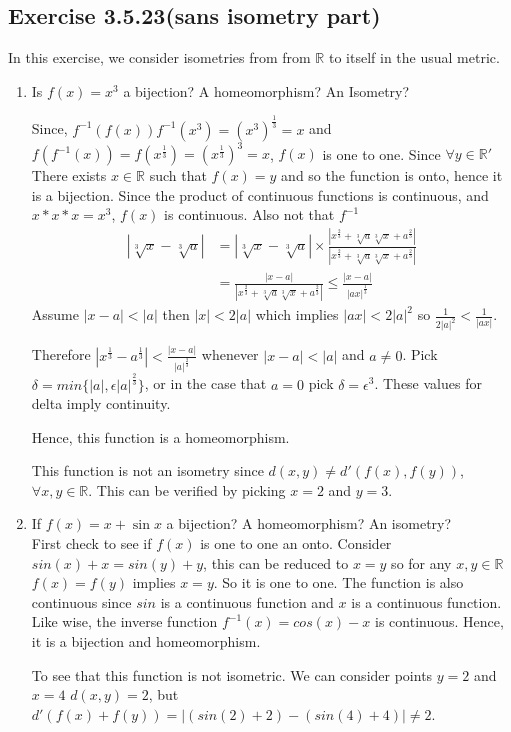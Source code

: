 \documentclass{tufte-book}
\theoremstyle{mytheoremstyle}
\theoremstyle{mylemstyle}
\theoremstyle{mydefstyle}
\begin{document}
\subsection{Exercise 3.5.23(sans isometry part)}
In  this exercise, we consider isometries from from $\mathbb{R}$ to itself in the usual metric.
\begin{enumerate}
\item Is $f(x) = x^3$ a bijection? A homeomorphism? An Isometry?

Since, $f^{-1}(f(x)) f^{-1}(x^3) = (x^3)^\frac{1}{3} = x$ and $f(f^{-1}(x))  = f(x^\frac{1}{3}) =(x^\frac{1}{3})^3 = x$, $f(x)$ is one to one.  Since $\forall y \in \mathbb{R}'$ There exists $x \in \mathbb{R}$ such that $f(x) = y$ and  so the function is onto, hence it is a bijection.   Since the product of continuous functions is continuous, and $x * x* x= x^3$, $f(x)$ is continuous.  Also not that $f^{-1}$
\begin{align*}
|\sqrt[3]{x}-\sqrt[3]{a}| &= |\sqrt[3]{x}-\sqrt[3]{a}| \times \frac {| x^{\frac 2 3} + \sqrt[3]{a}\sqrt[3]{x} + a^{\frac 2 3} |}{|x^{\frac 2 3} + \sqrt[3]{a}\sqrt[3]{x} + a^{\frac 2 3} |}\\
&= \frac {|x - a|}{|x^{\frac 2 3} + \sqrt[3]{a}\sqrt[3]{x} + a^{\frac 2 3} |} \le \frac {| x - a |}{| {ax} |^{\frac 1 3}}
\end{align*}
Assume $|x-a| < |a|$ then $|x| < 2|a|$ which implies $|ax| < 2|a|^2$ so  $\frac {1}{2|a|^2} < \frac {1} {|ax|}$.

Therefore $|x^{\frac{1}{3}} - a^{\frac{1}{3}}| < \frac{|x-a|}{|{a}|^{\frac{2}{3}}}$ whenever $|x - a| < |a|$ and $a \neq 0$.  Pick $\delta = min\{|a|, \epsilon|a|^\frac{2}{3}\}$, or in the case that $a = 0$ pick $\delta = \epsilon^3$.  These values for delta imply continuity.

Hence, this function is a homeomorphism. 

This function is not an isometry since $d(x,y) \neq d'(f(x), f(y))$, $\forall x,y \in \mathbb{R}$.  This can be verified by picking $x = 2$ and $y=3$.

\item If $f(x) = x + \sin x$ a bijection? A homeomorphism? An isometry?\\
First check to see if $f(x)$ is one to one an onto.  Consider $sin(x) + x = sin(y) + y$, this can be reduced to $x=y$ so for any $x,y \in \mathbb{R}$ $f(x) = f(y)$ implies $x = y$. So it is one to one.  The function is also continuous since $sin$ is a continuous function and $x$ is a continuous function.  Like wise, the inverse function $f^{-1}(x) = cos(x) - x$ is continuous.  Hence, it is a bijection and homeomorphism.

To see that this function is not isometric.  We can consider points $y=2$ and $x= 4$ $d(x,y) = 2$, but $d'(f(x) + f(y)) = |(sin(2) + 2) - (sin(4) + 4)| \neq 2$.

\end{enumerate}
\end{document}

